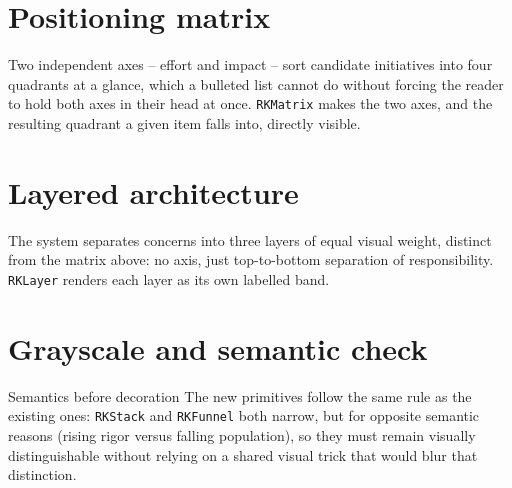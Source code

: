 \documentclass{reportkit}
\begin{document}
\section{Positioning matrix}
Two independent axes -- effort and impact -- sort candidate initiatives into four
quadrants at a glance, which a bulleted list cannot do without forcing the reader to
hold both axes in their head at once. \texttt{RKMatrix} makes the two axes, and the
resulting quadrant a given item falls into, directly visible.

\begin{diagram}[
  type=matrix,
  caption={Initiatives by effort and impact.},
  label={fig:matrix},
  source={Illustrative placement; not derived from a scored rubric.},
  description={A 2x2 matrix with effort on the horizontal axis and impact on the vertical axis, one initiative labelled in each quadrant.}
]
\end{diagram}

\section{Layered architecture}
The system separates concerns into three layers of equal visual weight, distinct from
the matrix above: no axis, just top-to-bottom separation of responsibility.
\texttt{RKLayer} renders each layer as its own labelled band.

\begin{diagram}[
  type=layer,
  caption={System layers, top to bottom.},
  label={fig:layer},
  source={Illustrative architecture.},
  description={Three stacked layers: presentation, application logic, and data storage.}
]
\end{diagram}

\section{Grayscale and semantic check}
\begin{principle}{Semantics before decoration}
The new primitives follow the same rule as the existing ones: \texttt{RKStack} and
\texttt{RKFunnel} both narrow, but for opposite semantic reasons (rising rigor versus
falling population), so they must remain visually distinguishable without relying on
a shared visual trick that would blur that distinction.
\end{principle}
\end{document}
